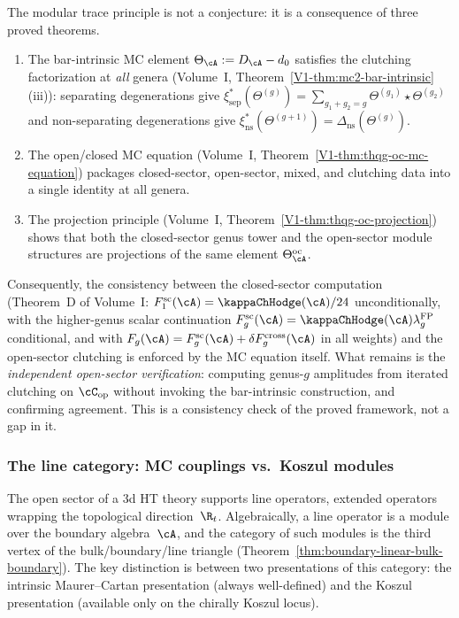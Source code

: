 \begin{remark}
\label{rem:modular-trace-principle}
The modular trace principle is not a conjecture: it is a
consequence of three proved theorems.
\begin{enumerate}[label=\textup{(\roman*)}]
\item The bar-intrinsic MC element
 $\Theta_\cA := D_\cA - d_0$
 satisfies the clutching factorization at \emph{all} genera
 (Volume~I, Theorem~\ref*{V1-thm:mc2-bar-intrinsic}(iii)):
 separating degenerations give
 $\xi_{\mathrm{sep}}^*(\Theta^{(g)})
 = \sum_{g_1+g_2=g} \Theta^{(g_1)} \star \Theta^{(g_2)}$
 and non-separating degenerations give
 $\xi_{\mathrm{ns}}^*(\Theta^{(g+1)})
 = \Delta_{\mathrm{ns}}(\Theta^{(g)})$.
\item The open/closed MC equation
 (Volume~I, Theorem~\ref*{V1-thm:thqg-oc-mc-equation})
 packages closed-sector, open-sector, mixed, and clutching
 data into a single identity at all genera.
\item The projection principle
 (Volume~I, Theorem~\ref*{V1-thm:thqg-oc-projection})
 shows that both the closed-sector genus tower and the
 open-sector module structures are projections of the
 same element $\Theta^{\mathrm{oc}}_\cA$.
\end{enumerate}
Consequently, the consistency between the closed-sector
computation (Theorem~D of Volume~I:
$F_1^{\mathrm{sc}}(\cA)=\kappaChHodge(\cA)/24$ unconditionally, with
the higher-genus scalar continuation
$F_g^{\mathrm{sc}}(\cA)
=\kappaChHodge(\cA)\lambda_g^{\mathrm{FP}}$ conditional, and with
$F_g(\cA)=F_g^{\mathrm{sc}}(\cA)
+\delta F_g^{\mathrm{cross}}(\cA)$ in all weights) and the
open-sector clutching is enforced by the MC equation itself.
What remains is the \emph{independent open-sector verification}:
computing genus-$g$ amplitudes from iterated clutching on
$\cC_{\mathrm{op}}$ without invoking the bar-intrinsic
construction, and confirming agreement. This is a consistency
check of the proved framework, not a gap in it.
\end{remark}

\subsubsection{The line category: MC couplings vs.\ Koszul
 modules}
\label{subsec:line-mc-vs-koszul}

The open sector of a 3d HT theory supports line operators, extended
operators wrapping the topological direction~$\R_t$. Algebraically,
a line operator is a module over the boundary algebra~$\cA$, and the
category of such modules is the third vertex of the
bulk/boundary/line triangle
(Theorem~\ref{thm:boundary-linear-bulk-boundary}). The key
distinction is between two presentations of this category: the
intrinsic Maurer--Cartan presentation (always well-defined) and the
Koszul presentation (available only on the chirally Koszul locus).

